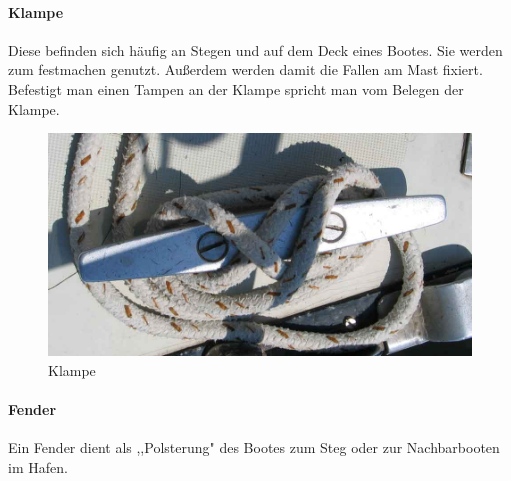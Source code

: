 \documentclass[12pt]{article}
\begin{document}
\paragraph{Klampe}
Diese befinden sich häufig an Stegen und auf dem Deck eines Bootes. Sie werden zum festmachen genutzt. Außerdem werden damit die Fallen am Mast fixiert.
Befestigt man einen Tampen an der Klampe spricht man vom Belegen der Klampe.
\begin{figure}[H]
\begin{center}
\includegraphics[scale=0.2]{bilder/klampe.jpg}
\end{center}
\caption{Klampe}
\label{segel}
\end{figure}

\paragraph{Fender}

Ein Fender dient als ,,Polsterung" des Bootes zum Steg oder zur Nachbarbooten im Hafen.
\end{document}
